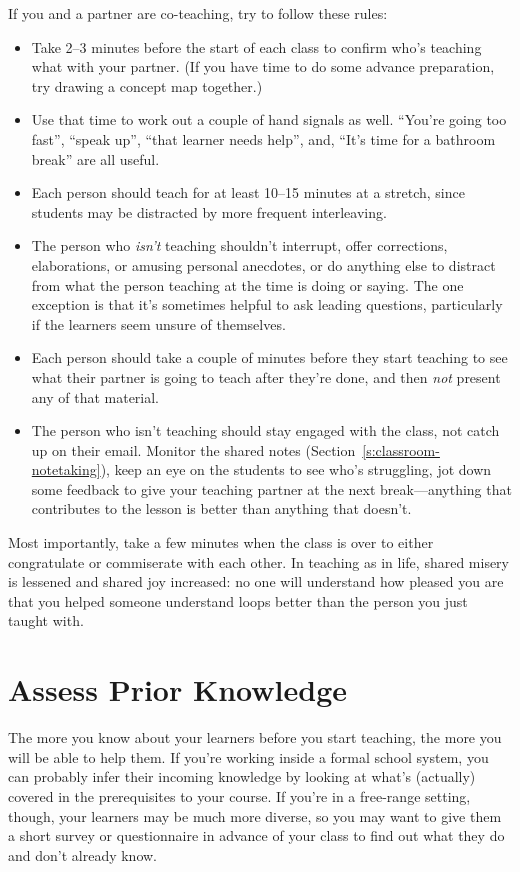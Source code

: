 If you and a partner are co-teaching, try to follow these rules:

\begin{itemize}
\item
  Take 2--3 minutes before the start of each class to confirm who's
  teaching what with your partner. (If you have time to do some
  advance preparation, try drawing a concept map together.)
\item
  Use that time to work out a couple of hand signals as well. ``You're
  going too fast'', ``speak up'', ``that learner needs help'', and, ``It's
  time for a bathroom break'' are all useful.
\item
  Each person should teach for at least 10--15 minutes at a stretch,
  since students may be distracted by more frequent interleaving.
\item
  The person who \emph{isn't} teaching shouldn't interrupt, offer
  corrections, elaborations, or amusing personal anecdotes, or do
  anything else to distract from what the person teaching at the time
  is doing or saying. The one exception is that it's sometimes helpful
  to ask leading questions, particularly if the learners seem unsure
  of themselves.
\item
  Each person should take a couple of minutes before they start
  teaching to see what their partner is going to teach after they're
  done, and then \emph{not} present any of that material.
\item
  The person who isn't teaching should stay engaged with the class,
  not catch up on their email. Monitor the shared notes
  (Section~\ref{s:classroom-notetaking}), keep an eye on the students
  to see who's struggling, jot down some feedback to give your
  teaching partner at the next break---anything that contributes to the
  lesson is better than anything that doesn't.
\end{itemize}

Most importantly, take a few minutes when the class is over to either
congratulate or commiserate with each other. In teaching as in life,
shared misery is lessened and shared joy increased: no one will
understand how pleased you are that you helped someone understand loops
better than the person you just taught with.

\section{Assess Prior Knowledge}\label{s:classroom-prior}

The more you know about your learners before you start teaching, the
more you will be able to help them. If you're working inside a formal
school system, you can probably infer their incoming knowledge by
looking at what's (actually) covered in the prerequisites to your
course. If you're in a free-range setting, though, your learners may be
much more diverse, so you may want to give them a short survey or
questionnaire in advance of your class to find out what they do and
don't already know.

